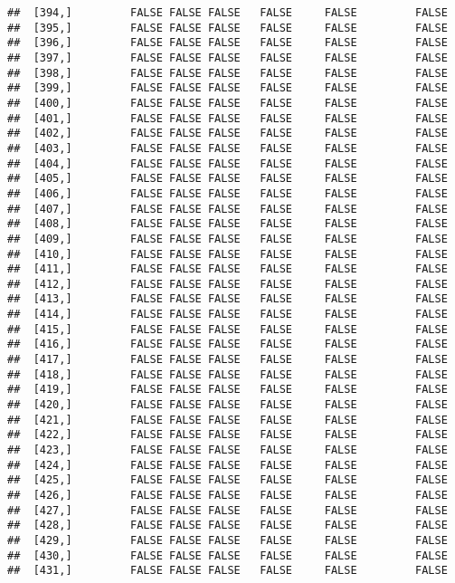 \documentclass[
]{article}
\begin{document}
\begin{verbatim}
##  [394,]         FALSE FALSE FALSE   FALSE     FALSE         FALSE
##  [395,]         FALSE FALSE FALSE   FALSE     FALSE         FALSE
##  [396,]         FALSE FALSE FALSE   FALSE     FALSE         FALSE
##  [397,]         FALSE FALSE FALSE   FALSE     FALSE         FALSE
##  [398,]         FALSE FALSE FALSE   FALSE     FALSE         FALSE
##  [399,]         FALSE FALSE FALSE   FALSE     FALSE         FALSE
##  [400,]         FALSE FALSE FALSE   FALSE     FALSE         FALSE
##  [401,]         FALSE FALSE FALSE   FALSE     FALSE         FALSE
##  [402,]         FALSE FALSE FALSE   FALSE     FALSE         FALSE
##  [403,]         FALSE FALSE FALSE   FALSE     FALSE         FALSE
##  [404,]         FALSE FALSE FALSE   FALSE     FALSE         FALSE
##  [405,]         FALSE FALSE FALSE   FALSE     FALSE         FALSE
##  [406,]         FALSE FALSE FALSE   FALSE     FALSE         FALSE
##  [407,]         FALSE FALSE FALSE   FALSE     FALSE         FALSE
##  [408,]         FALSE FALSE FALSE   FALSE     FALSE         FALSE
##  [409,]         FALSE FALSE FALSE   FALSE     FALSE         FALSE
##  [410,]         FALSE FALSE FALSE   FALSE     FALSE         FALSE
##  [411,]         FALSE FALSE FALSE   FALSE     FALSE         FALSE
##  [412,]         FALSE FALSE FALSE   FALSE     FALSE         FALSE
##  [413,]         FALSE FALSE FALSE   FALSE     FALSE         FALSE
##  [414,]         FALSE FALSE FALSE   FALSE     FALSE         FALSE
##  [415,]         FALSE FALSE FALSE   FALSE     FALSE         FALSE
##  [416,]         FALSE FALSE FALSE   FALSE     FALSE         FALSE
##  [417,]         FALSE FALSE FALSE   FALSE     FALSE         FALSE
##  [418,]         FALSE FALSE FALSE   FALSE     FALSE         FALSE
##  [419,]         FALSE FALSE FALSE   FALSE     FALSE         FALSE
##  [420,]         FALSE FALSE FALSE   FALSE     FALSE         FALSE
##  [421,]         FALSE FALSE FALSE   FALSE     FALSE         FALSE
##  [422,]         FALSE FALSE FALSE   FALSE     FALSE         FALSE
##  [423,]         FALSE FALSE FALSE   FALSE     FALSE         FALSE
##  [424,]         FALSE FALSE FALSE   FALSE     FALSE         FALSE
##  [425,]         FALSE FALSE FALSE   FALSE     FALSE         FALSE
##  [426,]         FALSE FALSE FALSE   FALSE     FALSE         FALSE
##  [427,]         FALSE FALSE FALSE   FALSE     FALSE         FALSE
##  [428,]         FALSE FALSE FALSE   FALSE     FALSE         FALSE
##  [429,]         FALSE FALSE FALSE   FALSE     FALSE         FALSE
##  [430,]         FALSE FALSE FALSE   FALSE     FALSE         FALSE
##  [431,]         FALSE FALSE FALSE   FALSE     FALSE         FALSE

\end{verbatim}
\end{document}
